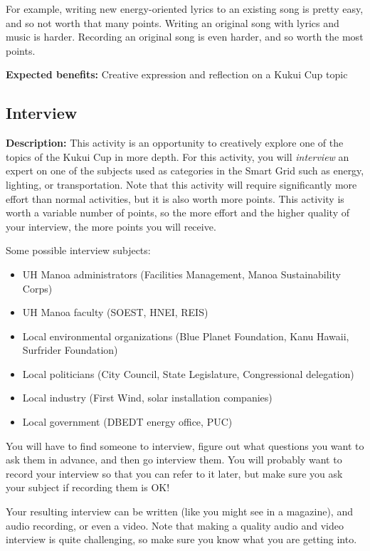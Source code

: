For example, writing new energy-oriented lyrics to an existing song is pretty easy, and so not worth that many points. Writing an original song with lyrics and music is harder. Recording an original song is even harder, and so worth the most points.

\vspace{2ex}
\textbf{Expected benefits:} Creative expression and reflection on a Kukui Cup topic


\subsection{Interview}

\textbf{Description:} This activity is an opportunity to creatively explore one of the topics of the Kukui Cup in more depth. For this activity, you will \emph{interview} an expert on one of the subjects used as categories in the Smart Grid such as energy, lighting, or transportation. Note that this activity will require significantly more effort than normal activities, but it is also worth more points. This activity is worth a variable number of points, so the more effort and the higher quality of your interview, the more points you will receive.

Some possible interview subjects:

\begin{itemize}
	\item UH Manoa administrators (Facilities Management, Manoa Sustainability Corps)
	\item UH Manoa faculty (SOEST, HNEI, REIS)
	\item Local environmental organizations (Blue Planet Foundation, Kanu Hawaii, Surfrider Foundation)
	\item Local politicians (City Council, State Legislature, Congressional delegation)
	\item Local industry (First Wind, solar installation companies)
	\item Local government (DBEDT energy office, PUC)
\end{itemize}


You will have to find someone to interview, figure out what questions you want to ask them in advance, and then go interview them. You will probably want to record your interview so that you can refer to it later, but make sure you ask your subject if recording them is OK!

Your resulting interview can be written (like you might see in a magazine), and audio recording, or even a video. Note that making a quality audio and video interview is quite challenging, so make sure you know what you are getting into.

